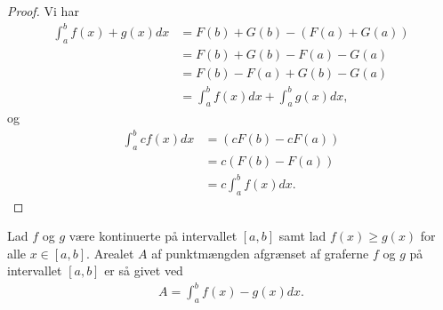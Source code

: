 \documentclass[12pt]{article}
\begin{document}
\begin{proof}
	Vi har
	\begin{align*}
		\int_a^b f(x) + g(x) dx &= F(b) + G(b) -(F(a) + G(a)) \\
		&= F(b) + G(b) - F(a) - G(a) \\
		&= F(b) - F(a) + G(b) - G(a) \\
		&= \int_a^b f(x) dx + \int_a^b g(x) dx, 
	\end{align*}
	og 
	\begin{align*}
		\int_a^b cf(x) dx &= (cF(b)-cF(a)) \\
		 &= c(F(b)-F(a)) \\
		 &= c\int_a^b f(x) dx.
	\end{align*}
\end{proof}
\begin{setn}\label{setn:hovedsætn}
	Lad $f$ og $g$ være kontinuerte på intervallet $[a,b]$ samt lad $f(x) \geq g(x)$ for alle $x \in [a,b]$. Arealet $A$ af
	punktmængden afgrænset af graferne $f$ og $g$ på intervallet $[a,b]$ er så givet ved
	\begin{align*}
		A = \int_a^b f(x) - g(x) dx.	
	\end{align*}	 
\end{setn}
\end{document}
